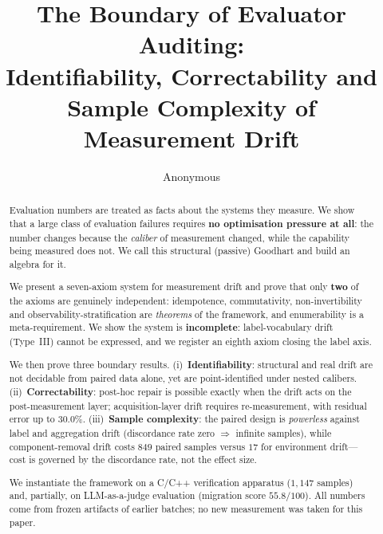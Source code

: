 \documentclass[11pt]{article}
\title{The Boundary of Evaluator Auditing:\\
Identifiability, Correctability and Sample Complexity of Measurement Drift}
\author{Anonymous}
\date{}
\begin{document}
\maketitle

\begin{abstract}
Evaluation numbers are treated as facts about the systems they measure. We show that a large class of
evaluation failures requires \textbf{no optimisation pressure at all}: the number changes because the
\emph{caliber} of measurement changed, while the capability being measured does not. We call this
structural (passive) Goodhart and build an algebra for it.

We present a seven-axiom system for measurement drift and prove that only \textbf{two} of the axioms are
genuinely independent: idempotence, commutativity, non-invertibility and observability-stratification are
\emph{theorems} of the framework, and enumerability is a meta-requirement. We show the system is
\textbf{incomplete}: label-vocabulary drift (Type~III) cannot be expressed, and we register an eighth axiom
closing the label axis.

We then prove three boundary results. (i)~\textbf{Identifiability}: structural and real drift are not
decidable from paired data alone, yet are point-identified under nested calibers. (ii)~\textbf{Correctability}:
post-hoc repair is possible exactly when the drift acts on the post-measurement layer; acquisition-layer
drift requires re-measurement, with residual error up to $30.0\%$. (iii)~\textbf{Sample complexity}: the
paired design is \emph{powerless} against label and aggregation drift (discordance rate zero
$\Rightarrow$ infinite samples), while component-removal drift costs $849$ paired samples versus $17$ for
environment drift---cost is governed by the discordance rate, not the effect size.

We instantiate the framework on a C/C++ verification apparatus ($1{,}147$ samples) and, partially, on
LLM-as-a-judge evaluation (migration score $55.8/100$). All numbers come from frozen artifacts of earlier
batches; no new measurement was taken for this paper.
\end{abstract}
\end{document}
